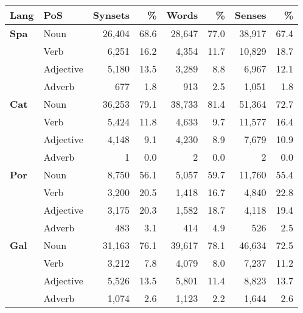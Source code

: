 \documentclass[runningheads]{llncs}
\begin{document}
        
\begin{table*}[!h]%
\centering
  
 \begin{tabular}{llrrrrrr}
         {\bf Lang} & {\bf PoS} & {\bf Synsets} & {\bf  \% }  & {\bf Words} &  {\bf  \% }  & {\bf Senses} & {\bf  \% }   \\
      
 \hline 
 
  {\bf Spa} &
    Noun &
    26,404 & 
    68.6 & 
    28,647 &
    77.0 &
    38,917 &
    67.4 \\
  &  
    Verb &
    6,251 & 
    16.2 & 
    4,354 &
    11.7 &
    10,829 &
    18.7 \\
  &  
    Adjective &
    5,180 & 
    13.5 & 
    3,289 &
    8.8 &
    6,967 &
    12.1 \\
 &   
    Adverb &
    677 & 
    1.8 & 
    913 &
    2.5 &
    1,051 &
    1.8 \\  \hline
    
   {\bf Cat}   &
        Noun &
    36,253 & 
    79.1 & 
    38,733 &
    81.4 &
    51,364 &
    72.7 \\
    &
    Verb &
    5,424 & 
    11.8 & 
    4,633 &
    9.7 &
    11,577 &
    16.4 \\
    &
    Adjective &
    4,148 & 
    9.1 & 
    4,230 &
    8.9 &
    7,679 &
    10.9 \\
    &
    Adverb &
    1 & 
    0.0 & 
    2 &
    0.0 &
    2 &
    0.0 \\  \hline
    
    {\bf Por}   &
     Noun &
    8,750 & 
    56.1 & 
    5,057 &
    59.7 &
    11,760 &
    55.4 \\
      &
    Verb &
    3,200 & 
    20.5 & 
    1,418 &
    16.7 &
    4,840 &
    22.8 \\
      &
    Adjective &
    3,175 & 
    20.3 & 
    1,582 &
    18.7 &
    4,118 &
    19.4 \\
      &
    Adverb &
    483 & 
    3.1 & 
    414 &
    4.9 &
    526 &
    2.5 \\ \hline
    
     {\bf Gal}   & 
      Noun &
    31,163 & 
    76.1 & 
    39,617 &
    78.1 &
    46,634 &
    72.5 \\
    & 
    Verb &
    3,212 & 
    7.8 & 
    4,079 &
    8.0 &
    7,237 &
    11.2 \\
    & 
    Adjective &
    5,526 & 
    13.5 & 
    5,801 &
    11.4 &
    8,823 &
    13.7 \\
    & 
    Adverb &
    1,074 & 
    2.6 & 
    1,123 &
    2.2 &
    1,644 &
    2.6 \\  \hline
    

\end{tabular}
\end{table*}
\end{document}
